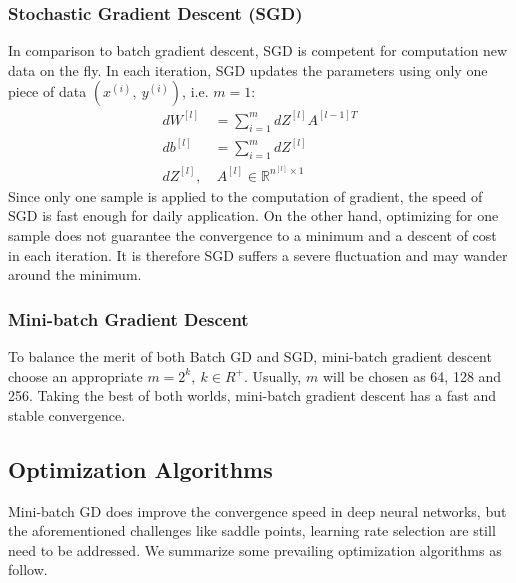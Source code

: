 \subsubsection{Stochastic Gradient Descent (SGD)}
In comparison to batch gradient descent, SGD is competent for computation
new data on the fly. In each iteration, SGD updates the parameters using
only one piece of data $ (x^{(i)},\ y^{(i)}) $, i.e. $ m = 1 $:
\begin{equation}
    \begin{split}
        dW^{[l]} & = \sum\limits_{i=1}^mdZ^{[l]}A^{[l-1]T} \\
        db^{[l]} & = \sum\limits_{i=1}^mdZ^{[l]} \\
        dZ^{[l]},&\ A^{[l]} \in \mathbb{R}^{n^{[l]}\times 1}
    \end{split}
\end{equation} 
Since only one sample is applied to the computation of gradient, the speed
of SGD is fast enough for daily application. On the other hand, optimizing
for one sample does not guarantee the convergence to a minimum and a descent
of cost in each iteration. It is therefore SGD suffers a severe fluctuation
and may wander around the minimum.

\subsubsection{Mini-batch Gradient Descent}
\label{sssec:MiniBatch}
To balance the merit of both Batch GD and SGD, mini-batch gradient descent
choose an appropriate $ m = 2^k,\ k\in R^+ $. Usually, $ m $ will be chosen
as 64, 128 and 256. Taking the best of both worlds, mini-batch gradient
descent has a fast and stable convergence.

\begin{comment} 
    \subsubsection{Comparison Between Variants}
    To illustrate the different between batch GD, SGD and mini-batch GD, we 
    implement a simple classification neural network. The data set is shown
    in \autoref{fig:sample}. The implementation based on the numpy package
    is attached in the \textbf{APPENDIX ADD HERE}.
    The size of data set is $ M = 300 $, we set $ m = 300,\ 1,\ 
    32 $ respectively for three variants.   
\end{comment}


\subsection{Optimization Algorithms}
Mini-batch GD does improve the convergence speed in deep neural
networks, but the aforementioned challenges like saddle points,
learning rate selection are still need to be addressed. We 
summarize some prevailing optimization algorithms as follow.

